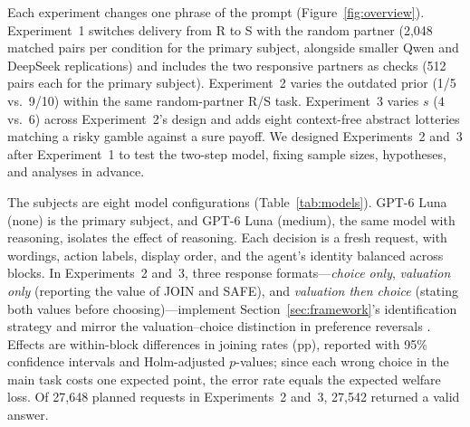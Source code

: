 \documentclass[11pt]{article}
\makeatletter
\renewcommand\section{\@startsection{section}{1}{\z@}{-1.9ex \@plus -0.6ex \@minus -.2ex}{1.0ex \@plus .2ex}{\normalfont\Large\bfseries}}
\makeatother
\begin{document}
\section{Experimental design}\label{sec:design}
Each experiment changes one phrase of the prompt (Figure~\ref{fig:overview}). Experiment~1 switches delivery from R to S with the random partner (2,048 matched pairs per condition for the primary subject, alongside smaller Qwen and DeepSeek replications) and includes the two responsive partners as checks (512 pairs each for the primary subject). Experiment~2 varies the outdated prior (1/5 vs.\ 9/10) within the same random-partner R/S task. Experiment~3 varies $s$ ($4$ vs.\ $6$) across Experiment~2's design and adds eight context-free abstract lotteries matching a risky gamble against a sure payoff. We designed Experiments~2 and~3 after Experiment~1 to test the two-step model, fixing sample sizes, hypotheses, and analyses in advance.

The subjects are eight model configurations (Table~\ref{tab:models}). GPT-6 Luna (none) is the primary subject, and GPT-6 Luna (medium), the same model with reasoning, isolates the effect of reasoning. Each decision is a fresh request, with wordings, action labels, display order, and the agent's identity balanced across blocks. In Experiments~2 and~3, three response formats---\emph{choice only}, \emph{valuation only} (reporting the value of JOIN and SAFE), and \emph{valuation then choice} (stating both values before choosing)---implement Section~\ref{sec:framework}'s identification strategy and mirror the valuation--choice distinction in preference reversals \citep{lichtenstein1971,tversky1990}. Effects are within-block differences in joining rates (pp), reported with 95\% confidence intervals and Holm-adjusted $p$-values; since each wrong choice in the main task costs one expected point, the error rate equals the expected welfare loss. Of 27,648 planned requests in Experiments~2 and~3, 27,542 returned a valid answer.
\end{document}
